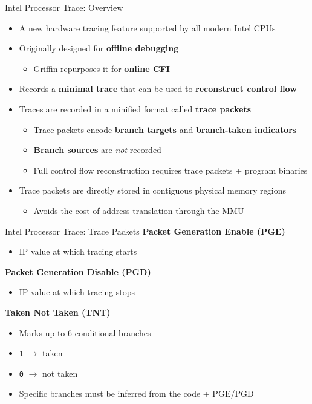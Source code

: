 \documentclass[12pt, dvipsnames, aspectratio=169]{beamer}
\begin{document}
\begin{frame}[c]{Intel Processor Trace: Overview}{}
  \begin{itemize}
    \item A new hardware tracing feature supported by all modern Intel CPUs

    \vfill
    \item Originally designed for \textbf{offline debugging}
    \begin{itemize}
      \item Griffin repurposes it for \textbf{online CFI}
    \end{itemize}

    \vfill
    \item Records a \textbf{minimal trace} that can be used to \textbf{reconstruct control flow}

    \vfill
    \item Traces are recorded in a minified format called \textbf{trace packets}
    \begin{itemize}
      \item Trace packets encode \textbf{branch targets} and \textbf{branch-taken indicators}
      \item \textbf{Branch sources} are \textit{not} recorded
      \item Full control flow reconstruction requires trace packets + program binaries
    \end{itemize}

    \vfill
    \item Trace packets are directly stored in contiguous physical memory regions
    \begin{itemize}
      \item Avoids the cost of address translation through the MMU
    \end{itemize}
  \end{itemize}
\end{frame}

\begin{frame}[c]{Intel Processor Trace: Trace Packets}{}
{\bf Packet Generation Enable (PGE)}
\begin{itemize}
  \item IP value at which tracing starts
\end{itemize}

\vfill
{\bf Packet Generation Disable (PGD)}
\begin{itemize}
  \item IP value at which tracing stops
\end{itemize}

\vfill
{\bf Taken Not Taken (TNT)}
\begin{itemize}
  \item Marks up to 6 conditional branches
  \item \texttt{1} $\rightarrow$ taken
  \item \texttt{0} $\rightarrow$ not taken
  \item Specific branches must be inferred from the code + PGE/PGD
\end{itemize}
\end{frame}
\end{document}
